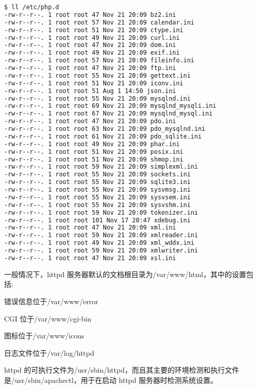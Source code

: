 \begin{lstlisting}[language=bash]
$ ll /etc/php.d
-rw-r--r--. 1 root root 47 Nov 21 20:09 bz2.ini
-rw-r--r--. 1 root root 57 Nov 21 20:09 calendar.ini
-rw-r--r--. 1 root root 51 Nov 21 20:09 ctype.ini
-rw-r--r--. 1 root root 49 Nov 21 20:09 curl.ini
-rw-r--r--. 1 root root 47 Nov 21 20:09 dom.ini
-rw-r--r--. 1 root root 49 Nov 21 20:09 exif.ini
-rw-r--r--. 1 root root 57 Nov 21 20:09 fileinfo.ini
-rw-r--r--. 1 root root 47 Nov 21 20:09 ftp.ini
-rw-r--r--. 1 root root 55 Nov 21 20:09 gettext.ini
-rw-r--r--. 1 root root 51 Nov 21 20:09 iconv.ini
-rw-r--r--. 1 root root 51 Aug 1 14:50 json.ini
-rw-r--r--. 1 root root 55 Nov 21 20:09 mysqlnd.ini
-rw-r--r--. 1 root root 69 Nov 21 20:09 mysqlnd_mysqli.ini
-rw-r--r--. 1 root root 67 Nov 21 20:09 mysqlnd_mysql.ini
-rw-r--r--. 1 root root 47 Nov 21 20:09 pdo.ini
-rw-r--r--. 1 root root 63 Nov 21 20:09 pdo_mysqlnd.ini
-rw-r--r--. 1 root root 61 Nov 21 20:09 pdo_sqlite.ini
-rw-r--r--. 1 root root 49 Nov 21 20:09 phar.ini
-rw-r--r--. 1 root root 51 Nov 21 20:09 posix.ini
-rw-r--r--. 1 root root 51 Nov 21 20:09 shmop.ini
-rw-r--r--. 1 root root 59 Nov 21 20:09 simplexml.ini
-rw-r--r--. 1 root root 55 Nov 21 20:09 sockets.ini
-rw-r--r--. 1 root root 55 Nov 21 20:09 sqlite3.ini
-rw-r--r--. 1 root root 55 Nov 21 20:09 sysvmsg.ini
-rw-r--r--. 1 root root 55 Nov 21 20:09 sysvsem.ini
-rw-r--r--. 1 root root 55 Nov 21 20:09 sysvshm.ini
-rw-r--r--. 1 root root 59 Nov 21 20:09 tokenizer.ini
-rw-r--r--. 1 root root 101 Nov 17 20:47 xdebug.ini
-rw-r--r--. 1 root root 47 Nov 21 20:09 xml.ini
-rw-r--r--. 1 root root 59 Nov 21 20:09 xmlreader.ini
-rw-r--r--. 1 root root 49 Nov 21 20:09 xml_wddx.ini
-rw-r--r--. 1 root root 59 Nov 21 20:09 xmlwriter.ini
-rw-r--r--. 1 root root 47 Nov 21 20:09 xsl.ini
\end{lstlisting}

一般情况下，httpd 服务器默认的文档根目录为/var/www/html，其中的设置包括:

\begin{compactitem}
\item 错误信息位于/var/www/error
\item CGI 位于/var/www/cgi-bin
\item 图标位于/var/www/icons
\item 日志文件位于/var/log/httpd
\end{compactitem}

httpd 的可执行文件为/usr/sbin/httpd，而且其主要的环境检测和执行文件是/usr/sbin/apachectl，用于在启动 httpd 服务器时检测系统设置。

